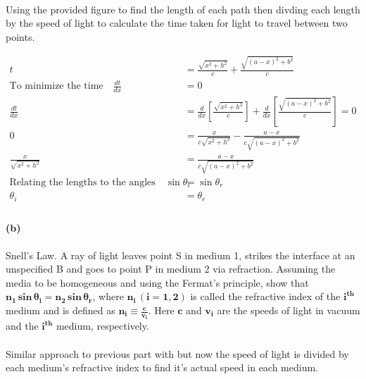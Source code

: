 \documentclass[]{article}
\begin{document}
{		\paragraph{} Using the provided figure to find the length of each path then divding each length by the speed of light to calculate the time taken for light to travel between two points.
		
			\begin{equation*}
				\begin{split}
					t &= \frac{\sqrt{x^2 + h^2}}{c} + \frac{\sqrt{(a-x)^2 + b^2}}{c} \\
					\text{To minimize the time} \quad \frac{dt}{dx} &= 0 \\
					\frac{dt}{dx} &= \frac{d}{dx} \left[ \frac{\sqrt{x^2 + h^2}}{c} \right] + \frac{d}{dx} \left[ \frac{\sqrt{(a-x)^2 + b^2}}{c} \right] = 0 \\
					0 &= \frac{x}{c\sqrt{x^2 + h^2}} - \frac{a-x}{c\sqrt{(a-x)^2 + b^2}} \\
					\frac{x}{\sqrt{x^2 + h^2}} &= \frac{a-x}{c\sqrt{(a-x)^2 + b^2}} \\
					\text{Relating the lengths to the angles} \quad \sin \theta_i &= \sin \theta_r \\
					\theta_i &= \theta_r \\
				\end{split}
			\end{equation*}
		
		\paragraph{(b)} Snell's Law. A ray of light leaves point S in medium 1, strikes the interface at an unspecified B and goes to point P in medium 2 via refraction. Assuming the media to be homogeneous and using the Fermat's principle, show that $\bm{n_1 \, sin \, \theta_i = n_2 \, sin \, \theta_r}$, where $\bm{n_i \, (i = 1, 2)}$ is	called the refractive index of the $\bm{i^{th}}$ medium and is defined as $\bm{n_i \equiv \frac{c}{v_i}}$. Here $\bm{c}$ and $\bm{v_i}$ are the speeds of light in vacuum and the $\bm{i^{th}}$ medium, respectively.
		
		\paragraph{} Similar approach to previous part with but now the speed of light is divided by each medium's refractive index to find it's actual speed in each medium.
		
}
\end{document}
